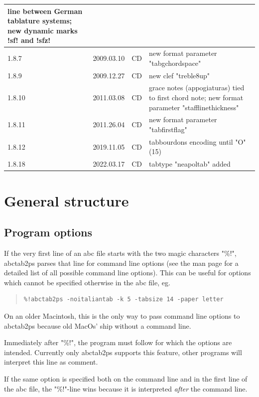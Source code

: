 \documentclass[a4paper]{article}
\begin{document}
\begin{center}
\begin{longtable}{|l|l|l|p{8cm}|}
    line between German tablature systems; new dynamic marks !sf! and !sfz!
    \\ \hline
1.8.7 & 2009.03.10 & CD & new format parameter "tabgchordspace" \\ \hline
1.8.9 & 2009.12.27 & CD & new clef "treble8up" \\ \hline
1.8.10 & 2011.03.08 & CD & grace notes (appogiaturas) tied to first chord note;
    new format parameter "stafflinethickness" \\ \hline
1.8.11 & 2011.26.04 & CD & new format parameter "tabfirstflag"
    \\ \hline
1.8.12 & 2019.11.05 & CD & tabbourdons encoding until "O" (15)
    \\ \hline
1.8.18 & 2022.03.17 & CD & tabtype "neapoltab" added
    \\ \hline
\end{longtable}
\end{center}

\section{General structure}

\subsection{Program options}
If the very first line of an abc file starts with the two magic 
characters "\%!", abctab2ps parses that line for command
line options (see the man page for a detailed list of all possible 
command line options). This can be useful for options which cannot
be specified otherwise in the abc file, eg.

\begin{quote}
\begin{verbatim}
%!abctab2ps -noitaliantab -k 5 -tabsize 14 -paper letter
\end{verbatim}
\end{quote}

On an older Macintosh, this is the only way to pass command line options
to abctab2ps because old MacOs' ship without a command line.
\par
Immediately after "\%!", the program must follow for which the 
options are intended. Currently only abctab2ps supports this
feature, other programs will interpret this line as comment.
\par
If the same option is specified both on the command line and
in the first line of the abc file, the "\%!"-line wins because
it is interpreted {\it after} the command line.
\end{document}
